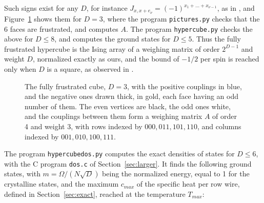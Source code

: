 \documentclass[11pt,a4paper]{article}
\theoremstyle{remark}
\begin{document}
Such signs exist for any $D$, for instance $J_{x,x+e_\nu}=(-1)^{x_1+\ldots+x_{\nu-1}}$, as in \cite{mp3}, and Figure~\ref{fig:cube} shows them for $D=3$, where the program \texttt{pictures.py} checks that the 6 faces are frustrated, and computes $A$. The program \texttt{hypercube.py} checks the above for $D\leq8$, and computes the ground states for $D\leq5$. Thus the fully frustrated hypercube is the Ising array of a weighing matrix of order $2^{D-1}$ and weight $D$, normalized exactly as ours, and the bound of $-1/2$ per spin is reached only when $D$ is a square, as observed in \cite{mp3}.

\begin{figure}[htb!]
\centering
{}
\caption{The fully frustrated cube, $D=3$, with the positive couplings in blue, and the negative ones drawn thick, in gold, each face having an odd number of them. The even vertices are black, the odd ones white, and the couplings between them form a weighing matrix $A$ of order 4 and weight 3, with rows indexed by $000,011,101,110$, and columns indexed by $001,010,100,111$.}\label{fig:cube}
\end{figure}

The program \texttt{hypercubedos.py} computes the exact densities of states for $D\leq6$, with the C program \texttt{dos.c} of Section~\ref{sec:larger}. It finds the following ground states, with $m=\Omega/(N\sqrt D)$ being the normalized energy, equal to 1 for the crystalline states, and the maximum $c_{max}$ of the specific heat per row wire, defined in Section~\ref{sec:exact}, reached at the temperature $T_{max}$:
\end{document}
